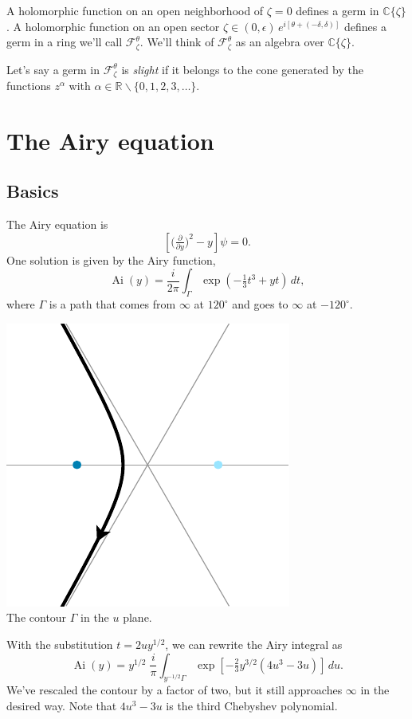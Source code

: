 \documentclass{article}
\theoremstyle{plain}
\newcommand{\R}{\mathbb{R}}
\newcommand{\C}{\mathbb{C}}
\DeclareMathOperator{\Ai}{Ai}
\begin{document}
\color{magenta}
A holomorphic function on an open neighborhood of $\zeta = 0$ defines a germ in $\C\{\zeta\}$. A holomorphic function on an open sector $\zeta \in (0, \epsilon)\,e^{i[\theta + (-\delta, \delta)]}$ defines a germ in a ring we'll call $\mathcal{F}_\zeta^\theta$. We'll think of $\mathcal{F}_\zeta^\theta$ as an algebra over $\C\{\zeta\}$.

Let's say a germ in $\mathcal{F}_\zeta^\theta$ is {\em slight} if it belongs to the cone generated by the functions $z^\alpha$ with $\alpha \in \R \smallsetminus \{0, 1, 2, 3, \ldots\}$.
\color{black}
\section{The Airy equation}
\subsection{Basics}
The Airy equation is
\begin{equation}\label{eqn:airy}
\left[\big(\tfrac{\partial}{\partial y}\big)^2 - y\right] \psi = 0.
\end{equation}
One solution is given by the Airy function,
\[ \Ai(y) = \frac{i}{2\pi} \int_{\Gamma} \exp\left(-\tfrac{1}{3}t^3 + yt\right)\,dt, \]
where $\Gamma$ is a path that comes from $\infty$ at $120^\circ$ and goes to $\infty$ at $-120^\circ$.
\begin{center}
\includegraphics{figures/u_contour_3.pdf} \\[1em]
{\small The contour $\Gamma$ in the $u$ plane.}
\end{center}
With the substitution $t = 2uy^{1/2}$, we can rewrite the Airy integral as
\[ \Ai(y) = y^{1/2}\;\frac{i}{\pi} \int_{y^{-1/2} \Gamma} \exp\left[-\tfrac{2}{3}y^{3/2} \left(4u^3 - 3u\right)\right]\,du. \]
We've rescaled the contour by a factor of two, but it still approaches $\infty$ in the desired way. Note that $4u^3 - 3u$ is the third Chebyshev polynomial.
\end{document}

